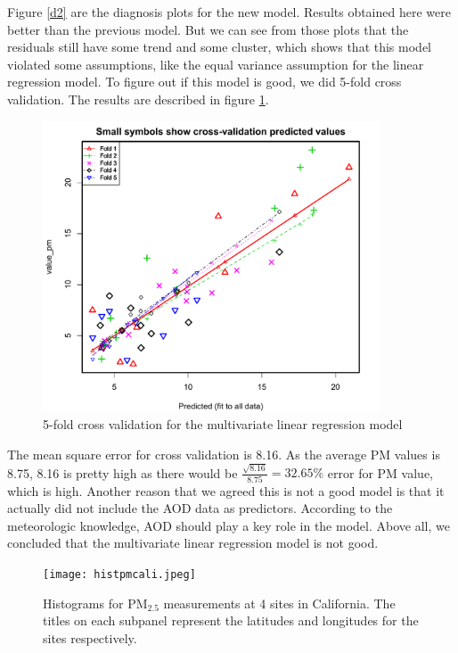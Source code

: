 \documentclass[10pt]{article}
\def\PM{{\mathrm{PM_{2.5}}}}
\begin{document}
Figure \ref{d2} are the diagnosis plots for the new model. Results obtained here were better than the previous model. But we can see from those plots that the residuals still have some trend and some cluster, which shows that this model violated some assumptions, like the equal variance assumption for the linear regression model. To figure out if this model is good, we did 5-fold cross validation. The results are described in figure \ref{cv}. 

\begin{figure}[H]
\centering
\includegraphics[width = 100mm]{cv_lm.pdf}
\caption{5-fold cross validation for the multivariate linear regression model}
\label{cv}
\end{figure}

The mean square error for cross validation is 8.16. As the average PM values is 8.75, 8.16 is pretty high as there would be $\frac{\sqrt{8.16}}{8.75}=32.65\%$ error for PM value, which is high. Another reason that we agreed this is not a good model is that it actually did not include the AOD data as predictors. According to the meteorologic knowledge, AOD should play a key role in the model. Above all, we concluded that the multivariate linear regression model is not good.



\begin{figure}[H]
\centering
\texttt{[image: histpmcali.jpeg]}
\caption{Histograms for $\PM$ measurements at 4 sites in California. The titles on each subpanel represent the latitudes and longitudes for the sites respectively.}
\end{figure}
\end{document}
